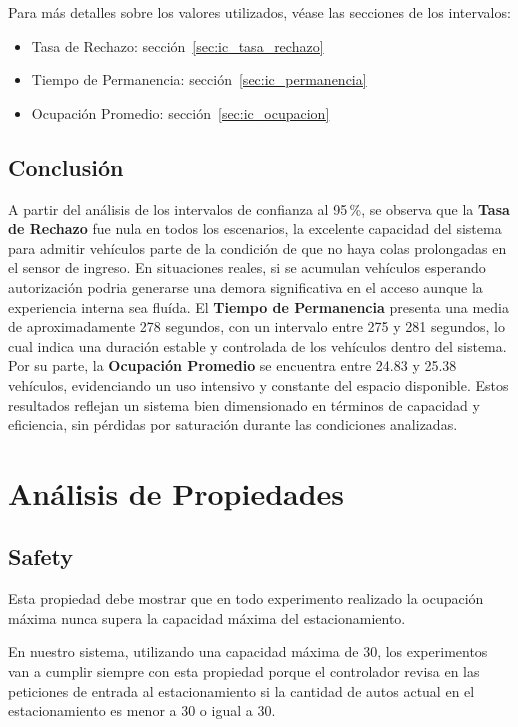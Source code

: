 \documentclass[12pt]{article}
\begin{document}
Para más detalles sobre los valores utilizados, véase las secciones de los intervalos:
\begin{itemize}
    \item Tasa de Rechazo: sección~\ref{sec:ic_tasa_rechazo}
    \item Tiempo de Permanencia: sección~\ref{sec:ic_permanencia}
    \item Ocupación Promedio: sección~\ref{sec:ic_ocupacion}
\end{itemize}

\subsection{Conclusión}

A partir del análisis de los intervalos de confianza al 95\,\%, se observa que la \textbf{Tasa de Rechazo} fue nula en todos los escenarios, la excelente capacidad del sistema para admitir vehículos parte de la condición de que no haya colas prolongadas en el sensor de ingreso. En situaciones reales, si se acumulan vehículos esperando autorización podria generarse una demora significativa en el acceso aunque la experiencia interna sea fluída. El \textbf{Tiempo de Permanencia} presenta una media de aproximadamente 278 segundos, con un intervalo entre 275 y 281 segundos, lo cual indica una duración estable y controlada de los vehículos dentro del sistema. Por su parte, la \textbf{Ocupación Promedio} se encuentra entre 24.83 y 25.38 vehículos, evidenciando un uso intensivo y constante del espacio disponible. Estos resultados reflejan un sistema bien dimensionado en términos de capacidad y eficiencia, sin pérdidas por saturación durante las condiciones analizadas.

\clearpage
\section{Análisis de Propiedades}
\subsection{Safety}
Esta propiedad debe mostrar que en todo experimento realizado la ocupación máxima nunca supera la capacidad máxima del estacionamiento.

En nuestro sistema, utilizando una capacidad máxima de 30, los experimentos van a cumplir siempre con esta propiedad porque el controlador revisa en las peticiones de entrada al estacionamiento si la cantidad de autos actual en el estacionamiento es menor a 30 o igual a 30.
\end{document}
